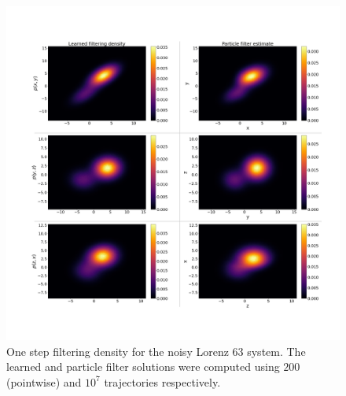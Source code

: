 \begin{figure}[!ht]
    \centering
\includegraphics[scale=0.21]{dynamic-fp/plots/dynamic-plots-L63-filter.png}
    \caption{One step filtering density for the noisy Lorenz 63 system. The learned and particle filter solutions were computed using $200$ (pointwise) and $10^7$ trajectories respectively.}
    \label{fig:L63-filter--dynamic-fp}
\end{figure}
